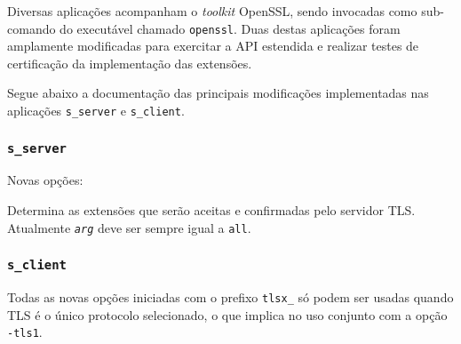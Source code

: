 Diversas aplicações acompanham o \emph{toolkit} OpenSSL, sendo invocadas como 
sub-comando do executável chamado \verb|openssl|. Duas destas aplicações foram 
amplamente modificadas para exercitar a \acs{API} estendida e realizar testes de 
certificação da implementação das extensões.

Segue abaixo a documentação das principais modificações implementadas nas aplicações 
\verb|s_server| e \verb|s_client|.

\subsubsection{\texttt{s\_server}}

Novas opções:

\begin{description}[\breaklabel\setlabelstyle{\ttfamily}]

\item[-tlsx\_allow \textit{arg}]
	Determina as extensões que serão aceitas e confirmadas pelo servidor TLS. 
	Atualmente {\tt\itshape arg} deve ser sempre igual a \verb|all|.

\end{description}

\subsubsection{\texttt{s\_client}}

Todas as novas opções iniciadas com o prefixo \verb|tlsx_| só podem ser usadas 
quando TLS é o único protocolo selecionado, o que implica no uso conjunto 
com a opção \verb|-tls1|.

